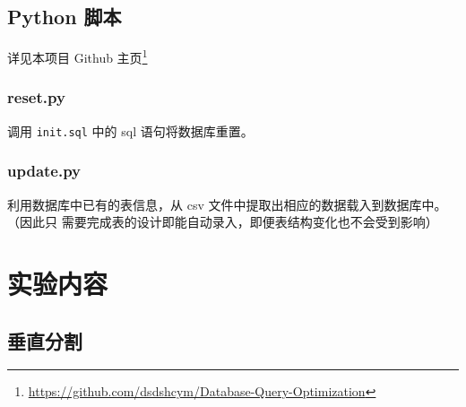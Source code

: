 \documentclass[11pt]{article}
\begin{document}
\subsection{Python 脚本}
\label{sec-2-3}
详见本项目 Github 主页\footnote{\url{https://github.com/dsdshcym/Database-Query-Optimization}}
\subsubsection{reset.py}
\label{sec-2-3-1}

调用 \texttt{init.sql} 中的 sql 语句将数据库重置。
\subsubsection{update.py}
\label{sec-2-3-2}

利用数据库中已有的表信息，从 csv 文件中提取出相应的数据载入到数据库中。（因此只
需要完成表的设计即能自动录入，即便表结构变化也不会受到影响）
\section{实验内容}
\label{sec-3}
\subsection{垂直分割}
\label{sec-3-1}
\end{document}
